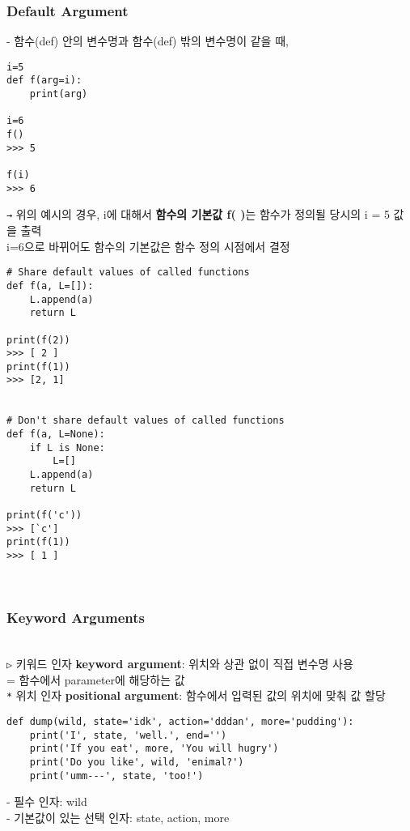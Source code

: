 \documentclass[11pt,a4paper]{article}
\begin{document}
\begin{spacing}{1.5}
\subsubsection{\Large\textbf{Default Argument}}
- 함수(def) 안의 변수명과 함수(def) 밖의 변수명이 같을 때,
\begin{lstlisting}[label={list:first}]
i=5
def f(arg=i):
    print(arg)

i=6
f()
>>> 5

f(i)
>>> 6
\end{lstlisting}
\texttt{→} 위의 예시의 경우,   i에 대해서 \textbf{함수의 기본값 f( )}는 함수가 정의될 당시의 i = 5 값을 출력\\
\hspace*{2em}i=6으로 바뀌어도 함수의 기본값은 함수 정의 시점에서 결정\\
\begin{lstlisting}[label={list:first}]
# Share default values of called functions
def f(a, L=[]):
    L.append(a)
    return L

print(f(2))
>>> [ 2 ]
print(f(1))
>>> [2, 1]


# Don't share default values of called functions
def f(a, L=None):
    if L is None:
        L=[]
    L.append(a)
    return L

print(f('c'))
>>> [`c']
print(f(1))
>>> [ 1 ]
\end{lstlisting}\\

\subsubsection{\Large\textbf{Keyword Arguments}}\\
\texttt{▷} 키워드 인자 \textbf{keyword argument}: 위치와 상관 없이 직접 변수명 사용\\
\hspace*{2em}=   함수에서 parameter에 해당하는 값\\
\texttt{*} 위치 인자 \textbf{positional argument}: 함수에서 입력된 값의 위치에 맞춰 값 할당
\begin{lstlisting}[label={list:first}]
def dump(wild, state='idk', action='dddan', more='pudding'):
    print('I', state, 'well.', end='')
    print('If you eat', more, 'You will hugry')
    print('Do you like', wild, 'enimal?')
    print('umm---', state, 'too!')
\end{lstlisting}
- 필수 인자: wild\\
- 기본값이 있는 선택 인자: state, action, more\\




\end{spacing}
\end{document}
